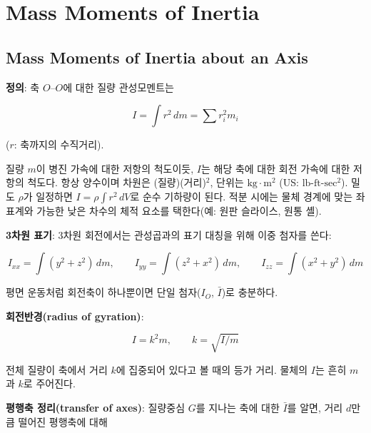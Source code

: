 ﻿\chapter{Mass Moments of Inertia} \label{ch:mass_moments_of_inertia}
    \section{Mass Moments of Inertia about an Axis} \label{sec:moi_about_axis}
        \textbf{정의}:
            축 $O$--$O$에 대한 질량 관성모멘트는
  
            \begin{equation}
                I = \int r^2\,dm = \sum r_i^2 m_i
            \end{equation}
    
            ($r$: 축까지의 수직거리).
  
            질량 $m$이 병진 가속에 대한 저항의 척도이듯, $I$는 해당 축에 대한 회전 가속에 대한 저항의 척도다. 항상 양수이며 차원은 (질량)(거리)$^2$, 단위는 $\mathrm{kg\cdot m^2}$ (US: $\mathrm{lb\text{-}ft\text{-}sec^2}$). 밀도 $\rho$가 일정하면 $I = \rho\int r^2\,dV$로 순수 기하량이 된다. 적분 시에는 물체 경계에 맞는 좌표계와 가능한 낮은 차수의 체적 요소를 택한다(예: 원판 슬라이스, 원통 셸).

        \textbf{3차원 표기}:
            3차원 회전에서는 관성곱과의 표기 대칭을 위해 이중 첨자를 쓴다:
  
            \begin{equation}
                I_{xx} = \int (y^2+z^2)\,dm, \qquad
                I_{yy} = \int (z^2+x^2)\,dm, \qquad
                I_{zz} = \int (x^2+y^2)\,dm
            \end{equation}
    
            평면 운동처럼 회전축이 하나뿐이면 단일 첨자($I_O$, $\bar I$)로 충분하다.

        \textbf{회전반경(radius of gyration)}:
  
            \begin{equation}
                I = k^2 m, \qquad k = \sqrt{I/m}
            \end{equation}
    
            전체 질량이 축에서 거리 $k$에 집중되어 있다고 볼 때의 등가 거리. 물체의 $I$는 흔히 $m$과 $k$로 주어진다.

        \textbf{평행축 정리(transfer of axes)}:
            질량중심 $G$를 지나는 축에 대한 $\bar I$를 알면, 거리 $d$만큼 떨어진 평행축에 대해
        
